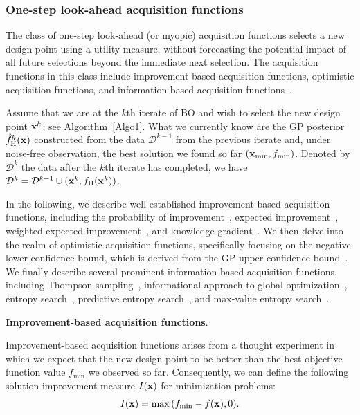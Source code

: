 \documentclass[iicol,sn-basic]{sn-jnl}%
\theoremstyle{thmstyleone}%
\theoremstyle{thmstyletwo}
\theoremstyle{thmstylethree}
\begin{document}
\begin{linenumbers}
\subsubsection{One-step look-ahead acquisition functions}\label{Sec611}

The class of one-step look-ahead (or myopic) acquisition functions selects a new design point using a utility measure, without forecasting the potential impact of all future selections beyond the immediate next selection.
The acquisition functions in this class include improvement-based acquisition functions, optimistic acquisition functions, and information-based acquisition functions~\citep{Shahriari2016}.

Assume that we are at the $k$th iterate of BO and wish to select the new design point ${\bf x}^{k}$; see Algorithm~\ref{Algo1}.
What we currently know are the GP posterior $\hat{f}_\text{H}^k({\bf x})$ constructed from the data $\mathcal{D}^{k-1}$ from the previous iterate and, under noise-free observation, the best solution we found so far $({\bf x}_{\min}, f_{\min})$.
Denoted by $\mathcal{D}^{k}$ the data after the $k$th iterate has completed, we have $\mathcal{D}^{k} = \mathcal{D}^{k-1} \cup ({\bf x}^{k},f_\text{H}({\bf x}^{k}))$.

In the following, we describe well-established improvement-based acquisition functions, including the probability of improvement~\citep{Kushner1964}, expected improvement~\citep{Mockus1975,Jones1998}, weighted expected improvement~\citep{Sobester2005}, and knowledge gradient~\citep{Frazier2008}.
We then delve into the realm of optimistic acquisition functions, specifically focusing on the negative lower confidence bound, which is derived from the GP upper confidence bound~\citep{Srinivas2010}.
We finally describe several prominent information-based acquisition functions, including  Thompson sampling~\citep{Agrawal2012}, informational approach to global optimization~\citep{Villemonteix2009}, entropy search~\citep{Hennig2012}, predictive entropy search~\citep{Lobato2014}, and max-value entropy search~\citep{ZWang2017}.

\noindent
\textbf{Improvement-based acquisition functions}.

Improvement-based acquisition functions arises from a thought experiment in which we expect that the new design point to be better than the best objective function value $f_\text{min}$ we observed so far.
Consequently, we can define the following solution improvement measure $I({\bf x})$ for minimization problems:
\begin{equation}\label{Eq41}
	I({\bf x}) = \max{\left(f_\text{min}-f({\bf x}),0\right)}.
\end{equation}


\end{linenumbers}
\end{document}
